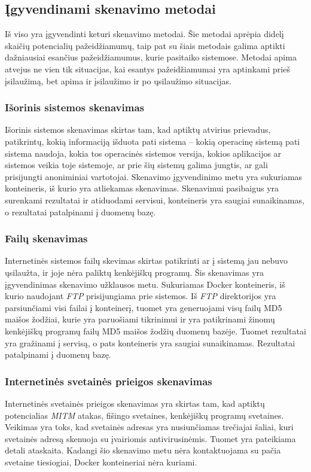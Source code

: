 \documentclass[a4paper,12pt,fleqn]{article}
\begin{document}
\subsection{Įgyvendinami skenavimo metodai}

Iš viso yra įgyvendinti keturi skenavimo metodai. Šie metodai aprėpia didelį skaičių potencialių pažeidžiamumų, taip pat su šiais metodais galima aptikti dažniausiai esančius pažeidžiamumus, kurie pasitaiko sistemose. Metodai apima atvejus ne vien tik situacijas, kai esantys pažeidžiamumai yra aptinkami prieš įsilaužimą, bet apima ir įsilaužimo ir po ųsilaužimo situacijas.

\subsubsection{Išorinis sistemos skenavimas}
\label{sec:scanOutside}
Išorinis sistemos skenavimas skirtas tam, kad aptiktų atvirius prievadus, patikrintų, kokią informaciją išduota pati sistema – kokią operacinę sistemą pati sistema naudoja, kokia tos operacinės sistemos versija, kokios aplikacijos ar sistemos veikia toje sistemoje, ar prie šių sistemų galima jungtis, ar gali prisijungti anoniminiai vartotojai. Skenavimo įgyvendinimo metu yra sukuriamas konteineris, iš kurio yra atliekamas skenavimas. Skenavimui pasibaigus yra surenkami rezultatai ir atiduodami servisui, konteineris yra saugiai sunaikinamas, o rezultatai patalpinami į duomenų bazę.
\subsubsection{Failų skenavimas}
\label{sec:scanFile}
Internetinės sistemos failų skevimas skirtas patikrinti ar į sistemą jau nebuvo ųsilaužta, ir joje nėra paliktų kenkėjiškų programų. Šis skenavimas yra įgyvendinimas skenavimo užklausos metu. Sukuriamas Docker konteineris, iš kurio naudojant \textit{FTP} prisijungiama prie sistemos. Iš \textit{FTP} direktorijos yra parsiunčiami visi failai į konteinerį, tuomet yra generuojami visų failų MD5 maišos žodžiai, kurie yra paruošiami tikrinimui ir yra patikrinami žinomų kenkėjiškų programų failų MD5 maišos žodžių duomenų bazėje. Tuomet rezultatai yra gražinami į servisą, o pats konteineris yra saugiai sunaikinamas. Rezultatai patalpinami į duomenų bazę.
\subsubsection{Internetinės svetainės prieigos skenavimas}
\label{sec:scanUrl}
Internetinės svetainės prieigos skenavimas yra skirtas tam, kad aptiktų potencialias \textit{MITM} atakas, fišingo svetaines, kenkėjiškų programų svetaines. Veikimas yra toks, kad svetainės adresas yra nusiunčiamas trečiajai šaliai, kuri svetainės adresą skenuoja su įvairiomis antivirusinėmis. Tuomet yra pateikiama detali ataskaita. Kadangi šio skenavimo metu nėra kontaktuojama su pačia svetaine tiesiogiai, Docker konteineriai nėra kuriami.
\end{document}
